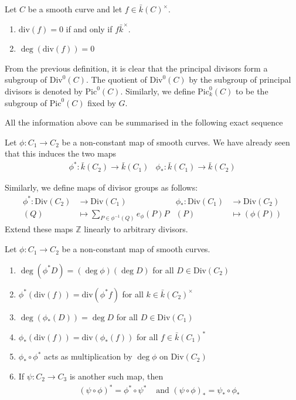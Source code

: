 \documentclass[oneside, 12pt]{scrbook}
\newcommand{\ZZ}{\mathbb Z}
\theoremstyle{theorem}
\begin{document}
\begin{proposition}
Let $C$ be a smooth curve and let $f \in \bar{k}(C)^{\times}$. 
\begin{enumerate}
\item $\mathrm{div}(f) = 0$ if and only if $f \bar{k}^{\times}$.
\item $\deg(\mathrm{div}(f))=0$
\end{enumerate}
\end{proposition}

\begin{definition}
From the previous definition, it is clear that the principal divisors form a subgroup of $\mathrm{Div}^{0}(C)$. The quotient of $\mathrm{Div}^{0}(C)$ by the subgroup of principal divisors is denoted by $\mathrm{Pic}^{0}(C)$. Similarly, we define $\mathrm{Pic}^{0}_{k}(C)$ to be the subgroup of $\mathrm{Pic}^{0}(C)$ fixed by $G$.
\end{definition}

All the information above can be summarised in the following exact sequence 

Let $\phi : C_{1} \rightarrow C_{2}$ be a non-constant map of smooth curves. We have already seen that this induces the two maps 
\begin{align*}
\phi^{*} : \bar{k}(C_{2}) \rightarrow \bar{k}(C_{1}) & \phi_{*} : \bar{k}(C_{1}) \rightarrow \bar{k}(C_{2}) 
\end{align*}

Similarly, we define maps of divisor groups as follows: 
\begin{align*}
\phi^{*} : \mathrm{Div}(C_{2}) &\rightarrow  \mathrm{Div}(C_{1}) & \phi_{*} : \mathrm{Div}(C_{1}) &\rightarrow \mathrm{Div}(C_{2}) \\
(Q) &\mapsto \sum_{P \in \phi^{-1}(Q)}e_{\phi}(P) P & (P) &\mapsto (\phi(P))
\end{align*}
Extend these maps $\ZZ$ linearly to arbitrary divisors. 

\begin{proposition}
Let $\phi : C_{1} \rightarrow C_{2}$ be a non-constant map of smooth curves. 
\begin{enumerate}
\item $\deg (\phi^{*} D) = (\deg \phi)(\deg D)$ for all $D \in \mathrm{Div}(C_{2})$
\item $\phi^* (\mathrm{div}(f)) = \mathrm{div}(\phi^* f)$ for all $k \in \bar{k}(C_{2})^{\times}$
\item $\deg(\phi_{*}(D)) = \deg D$ for all $D \in \mathrm{Div}(C_{1})$
\item $\phi_{*}(\mathrm{div}(f)) = \mathrm{div}(\phi_{*}(f))$ for all $f \in \bar{k}(C_{1})^{*}$
\item $\phi_{*} \circ \phi^*$ acts as multiplication by $\deg \phi$ on $\mathrm{Div}(C_{2})$
\item If $\psi : C_{2} \rightarrow C_{3}$ is another such map, then 
\begin{align*}
(\psi \circ \phi)^* = \phi^* \circ \psi^* &\text{ and } (\psi \circ \phi)_{*} = \psi_{*} \circ \phi_{*}
\end{align*}
\end{enumerate}
\end{proposition}
\end{document}
